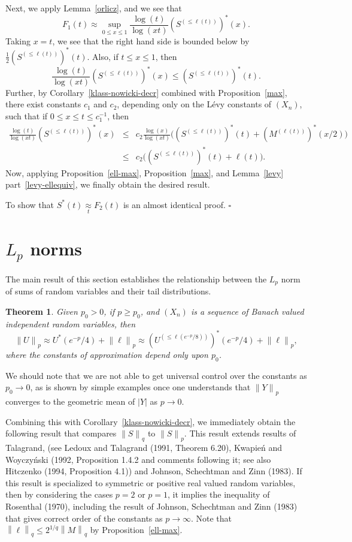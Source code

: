 \documentclass[12pt]{article}
\newtheorem{thm}{Theorem}[section]
\newcommand{\approxsb}[1]{\mathrel{\mathop{\approx}\limits_{#1}}}
\newcommand{\normo}[1]{{\left\|#1\right\|}}
\newcommand{\smodo}[1]{{\mathopen|#1\mathclose|}}
\newcommand{\snormo}[1]{{\mathopen\|#1\mathclose\|}}
\newcommand{\qed}{\leavevmode\unskip\penalty9999
                  \hbox{}\nobreak\hfill$\square$\goodbreak\medskip}
\begin{document}
Next, we apply Lemma~\ref{orlicz}, and we see that
$$ F_1(t) 
   \approx 
   \sup_{0\le x \le 1}{\frac{\log(t) }{ \log(xt)}} (S^{(\le \ell(t))})^*(x) .$$ 
Taking $x = t$, we see that the right hand side is bounded below
by ${\frac{1}{ 2}} (S^{(\le\ell(t))})^*(t)$. 
Also, if $t \le x \le 1$,
then $$ {\frac{\log(t) }{ \log(xt)}} (S^{(\le \ell(t))})^*(x)
\le (S^{(\le \ell(t))})^*(t) .$$ 
Further, by Corollary~\ref{klass-nowicki-decr} combined with
Proposition~\ref{max}, there exist
constants $c_1$ and $c_2$, depending only on the L\'evy constants of
$(X_n)$, such that if $0 \le x \le t \le c_1^{-1}$, then 
\begin{eqnarray*}
  {\frac{\log(t) }{ \log(xt)}} (S^{(\le \ell(t))})^*(x)
  &\le& c_2 {\frac{\log(x) }{ \log(xt)}} \bigl((S^{(\le \ell(t))})^*(t)+
        (M^{(\ell(t))})^*(x/2)\bigr) \\
  &\le& c_2 \bigl((S^{(\le \ell(t))})^*(t) + \ell(t)\bigr) .
\end{eqnarray*} 
Now, applying Proposition~\ref{ell-max}, Proposition~\ref{max}, 
and Lemma~\ref{levy} 
part~\ref{levy-ellequiv}, we finally 
obtain the desired result.

To show that $S^*(t) \approxsb t F_2(t)$ is an almost identical
proof. \qed

\section{$L_p$ norms}
\label{Lp}

The main result of this section establishes the
relationship between the $L_p$ norm of sums of random variables and
their tail distributions.

\begin{thm}
\label{lp}
Given $p_0>0$, if
$p \ge p_0$, and $(X_n)$ is a sequence of Banach valued
independent random variables,
then
$$ \snormo U_p \approx U^*(e^{-p}/4) + \snormo
\ell_p   \approx (U^{(\le \ell(e^{-p}/8))})^*(e^{-p}/4) + \snormo
\ell_p ,$$ 
where the constants of approximation depend only upon
$p_0$.
\end{thm}

We should note that we are not able to get universal control over
the constants as $p_0 \to0$, as is shown by
simple examples once one understands that $\snormo Y_p$ converges to
the geometric mean of $\smodo Y$ as $p \to 0$.

Combining this with Corollary~\ref{klass-nowicki-decr},
we immediately obtain the  following result that compares $\snormo S_q$
to $\snormo S_p$. This result extends results of Talagrand, (see
Ledoux and Talagrand (1991, Theorem 6.20), Kwapie\'n and Woyczy\'nski
(1992, Proposition 1.4.2 and comments following it;  see also 
Hitczenko (1994, Proposition 4.1))   and Johnson, Schechtman and Zinn 
(1983).  If this result is specialized to symmetric or positive real
valued random variables, then by considering the cases $p=2$ or $p=1$, 
it implies the inequality of Rosenthal
(1970), including the 
result of Johnson, Schechtman and Zinn (1983) that gives
correct order of the constants as $p \to \infty$.  Note that
$\normo \ell_q \le 2^{1/q} \normo M_q$ by Proposition~\ref{ell-max}.
\end{document}
